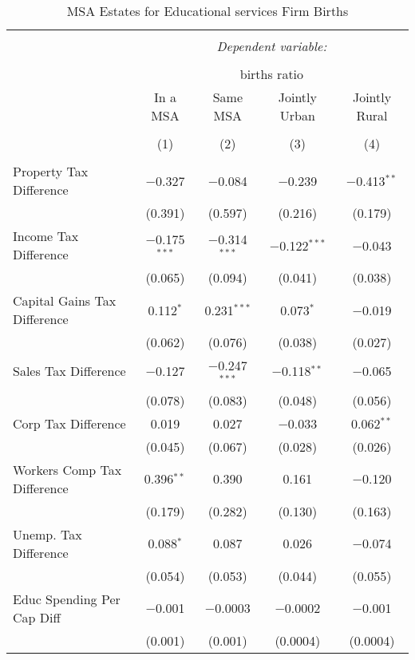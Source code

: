 
\begin{table}[!htbp] \centering 
  \caption{MSA Estates for  Educational services Firm Births} 
  \label{61metro} 
\begin{tabular}{@{\extracolsep{5pt}}lcccc} 
\\[-1.8ex]\hline 
\hline \\[-1.8ex] 
 & \multicolumn{4}{c}{\textit{Dependent variable:}} \\ 
\cline{2-5} 
\\[-1.8ex] & \multicolumn{4}{c}{births ratio} \\ 
 & In a MSA & Same MSA & Jointly Urban & Jointly Rural \\ 
\\[-1.8ex] & (1) & (2) & (3) & (4)\\ 
\hline \\[-1.8ex] 
 Property Tax Difference & $-$0.327 & $-$0.084 & $-$0.239 & $-$0.413$^{**}$ \\ 
  & (0.391) & (0.597) & (0.216) & (0.179) \\ 
  Income Tax Difference & $-$0.175$^{***}$ & $-$0.314$^{***}$ & $-$0.122$^{***}$ & $-$0.043 \\ 
  & (0.065) & (0.094) & (0.041) & (0.038) \\ 
  Capital Gains Tax Difference & 0.112$^{*}$ & 0.231$^{***}$ & 0.073$^{*}$ & $-$0.019 \\ 
  & (0.062) & (0.076) & (0.038) & (0.027) \\ 
  Sales Tax Difference & $-$0.127 & $-$0.247$^{***}$ & $-$0.118$^{**}$ & $-$0.065 \\ 
  & (0.078) & (0.083) & (0.048) & (0.056) \\ 
  Corp Tax Difference & 0.019 & 0.027 & $-$0.033 & 0.062$^{**}$ \\ 
  & (0.045) & (0.067) & (0.028) & (0.026) \\ 
  Workers Comp Tax Difference & 0.396$^{**}$ & 0.390 & 0.161 & $-$0.120 \\ 
  & (0.179) & (0.282) & (0.130) & (0.163) \\ 
  Unemp. Tax Difference & 0.088$^{*}$ & 0.087 & 0.026 & $-$0.074 \\ 
  & (0.054) & (0.053) & (0.044) & (0.055) \\ 
  Educ Spending Per Cap Diff & $-$0.001 & $-$0.0003 & $-$0.0002 & $-$0.001 \\ 
  & (0.001) & (0.001) & (0.0004) & (0.0004) \\ 

\end{tabular}
\end{table}
